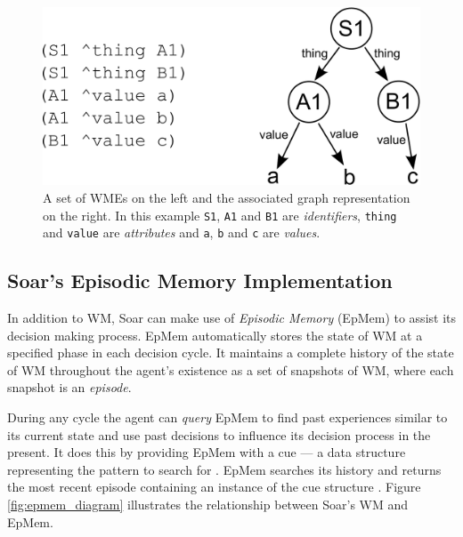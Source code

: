 \documentclass[envcountsame]{llncs}
\begin{document}
  \begin{figure}
  \centering
  \includegraphics[scale=0.3]{graphics/wm_diagram.pdf}
  \caption{A set of WMEs on the left and the associated graph representation on the right. In this example \texttt{S1},
  \texttt{A1} and \texttt{B1} are \emph{identifiers}, \texttt{thing} and \texttt{value} are \emph{attributes}
  and \texttt{a}, \texttt{b} and \texttt{c} are \emph{values}.}
  \label{fig:wm_diagram}
  \end{figure}

  \subsection{Soar's Episodic Memory Implementation}

  In addition to WM, Soar can make use of \emph{Episodic Memory} (EpMem) to assist its decision making process.
  EpMem automatically stores the state of WM at a specified phase in each decision cycle.
  It maintains a complete history of the state of WM throughout the agent's existence as a set of snapshots of WM, where each snapshot is an \emph{episode}.

  During any cycle the agent can \emph{query} EpMem to find past experiences similar to its current state and use past decisions to influence its decision process in the present.
  It does this by providing EpMem with a cue --- a data structure representing the pattern to search for \cite{laird2008extending}.
  EpMem searches its history and returns the most recent episode containing an instance of the cue structure \cite{nuxoll2004cognitive}.
  Figure \ref{fig:epmem_diagram} illustrates the relationship between Soar's WM and EpMem.
  
\end{document}
